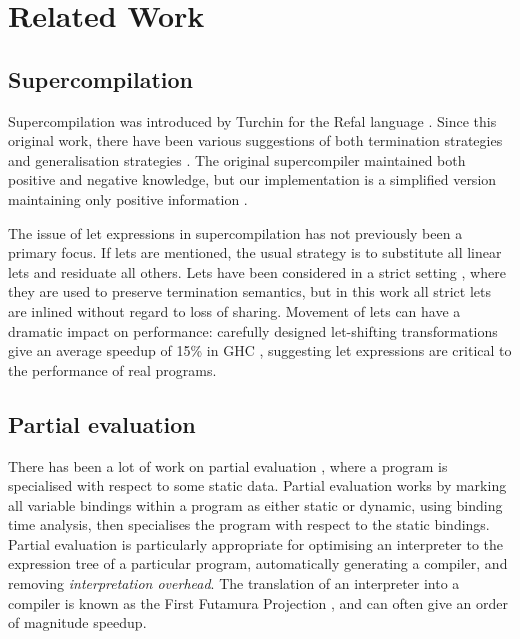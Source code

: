 \section{Related Work}
\label{secS:related}

\subsection{Supercompilation}

Supercompilation \cite{supercompilation,turchin:experiments} was introduced by Turchin for the Refal language \cite{refal}. Since this original work, there have been various suggestions of both termination strategies and generalisation strategies \cite{turchin:generalisation,sorensen:supercompilation,leuschel:homeomorphic}. The original supercompiler maintained both positive and negative knowledge, but our implementation is a simplified version maintaining only positive information \cite{secher:perfect_supercompilation}.

The issue of let expressions in supercompilation has not previously been a primary focus. If lets are mentioned, the usual strategy is to substitute all linear lets and residuate all others. Lets have been considered in a strict setting \cite{jonsson:supercompilation}, where they are used to preserve termination semantics, but in this work all strict lets are inlined without regard to loss of sharing. Movement of lets can have a dramatic impact on performance: carefully designed let-shifting transformations give an average speedup of 15\% in GHC \cite{spj:letfloating}, suggesting let expressions are critical to the performance of real programs.

\subsection{Partial evaluation}

There has been a lot of work on partial evaluation \cite{jones:partial_evaluation}, where a program is specialised with respect to some static data. Partial evaluation works by marking all variable bindings within a program as either static or dynamic, using binding time analysis, then specialises the program with respect to the static bindings. Partial evaluation is particularly appropriate for optimising an interpreter to the expression tree of a particular program, automatically generating a compiler, and removing \textit{interpretation overhead}. The translation of an interpreter into a compiler is known as the First Futamura Projection \cite{futanama:projections}, and can often give an order of magnitude speedup.

